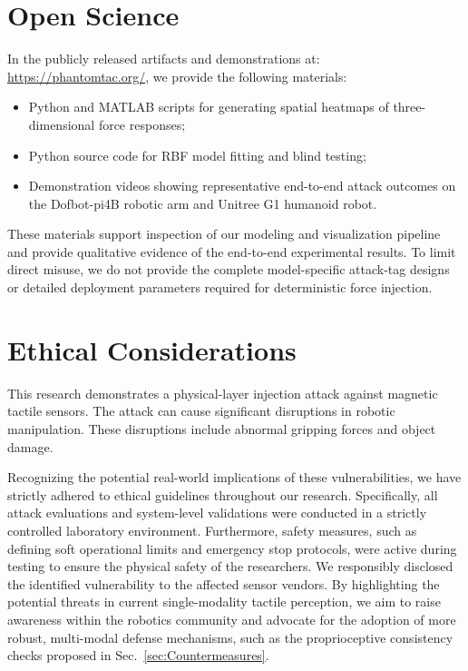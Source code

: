 \appendix %

\section{Open Science} %
In the publicly released artifacts and demonstrations at:
\url{https://phantomtac.org/},
we provide the following materials:
\begin{itemize}
\item Python and MATLAB scripts for generating spatial heatmaps of three-dimensional force responses;
\item Python source code for RBF model fitting and blind testing;
\item Demonstration videos showing representative end-to-end attack outcomes on the Dofbot-pi4B robotic arm and Unitree G1 humanoid robot.
\end{itemize}

These materials support inspection of our modeling and visualization pipeline and provide qualitative evidence of the end-to-end experimental results. 
To limit direct misuse, we do not provide the complete model-specific attack-tag designs or detailed deployment parameters required for deterministic force injection.


\section{Ethical Considerations} 
This research demonstrates a physical-layer injection attack against magnetic tactile sensors. The attack can cause significant disruptions in robotic manipulation. 
These disruptions include abnormal gripping forces and object damage.

Recognizing the potential real-world implications of these vulnerabilities, we have strictly adhered to ethical guidelines throughout our research.
Specifically, all attack evaluations and system-level validations were conducted in a strictly controlled laboratory environment. Furthermore, safety measures, such as defining soft operational limits and emergency stop protocols, were active during testing to ensure the physical safety of the researchers. We responsibly disclosed the identified vulnerability to the affected sensor vendors.
By highlighting the potential threats in current single-modality tactile perception, we aim to raise awareness within the robotics community and advocate for the adoption of more robust, multi-modal defense mechanisms, such as the proprioceptive consistency checks proposed in Sec.~\ref{sec:Countermeasures}.



